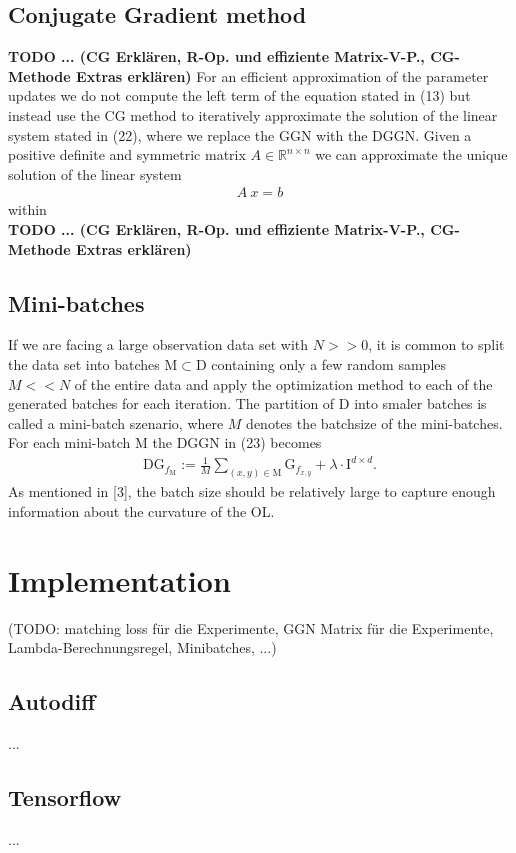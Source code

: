 \documentclass[conference]{IEEEtran}
\begin{document}
\subsection{Conjugate Gradient method}
\textbf{TODO ... (CG Erklären, R-Op. und effiziente Matrix-V-P., CG-Methode Extras erklären)}
For an efficient approximation of the parameter updates we do not compute the left term of the equation stated in (13) but instead use the CG method to iteratively approximate the solution of the linear system stated in (22), where we replace the GGN with the DGGN. Given a positive definite and symmetric matrix $A\in \mathbb{R}^{n\times n}$ we can approximate the unique solution of the linear system 
\begin{align}
A\:x = b
\end{align}
within 
\\\textbf{TODO ... (CG Erklären, R-Op. und effiziente Matrix-V-P., CG-Methode Extras erklären)}

\subsection{Mini-batches}
If we are facing a large observation data set with $N>>0$, it is common to split the data set into batches $\mathrm{M}\subset\mathrm{D}$ containing only a few random samples $M<<N$ of the entire data and apply the optimization method to each of the generated batches for each iteration. The partition of $\mathrm{D}$ into smaler batches is called a mini-batch szenario, where $M$ denotes the batchsize of the mini-batches. For each mini-batch $\mathrm{M}$ the DGGN in (23) becomes
\begin{align}
\mathrm{DG}_{f_{\mathrm{M}}} := \frac{1}{M}\sum_{(x, y)\in \mathrm{M}}^{}\mathrm{G}_{f_{x, y}} + \lambda\cdot\mathrm{I}^{d\times d}.
\end{align}
As mentioned in [3], the batch size should be relatively large to capture enough information about the curvature of the OL. 

\section {Implementation}
(TODO: matching loss für die Experimente, GGN Matrix für die Experimente, Lambda-Berechnungsregel, Minibatches, ...)
\subsection{Autodiff}
...
\subsection{Tensorflow}
...
\end{document}
